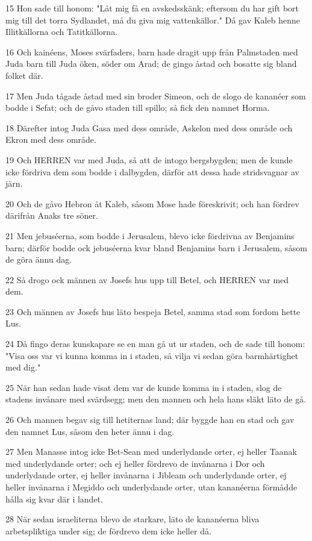 \par 15 Hon sade till honom: "Låt mig få en avskedsskänk; eftersom du har gift bort mig till det torra Sydlandet, må du giva mig vattenkällor." Då gav Kaleb henne Illitkällorna och Tatitkällorna.
\par 16 Och kainéens, Moses svärfaders, barn hade dragit upp från Palmstaden med Juda barn till Juda öken, söder om Arad; de gingo åstad och bosatte sig bland folket där.
\par 17 Men Juda tågade åstad med sin broder Simeon, och de slogo de kananéer som bodde i Sefat; och de gåvo staden till spillo; så fick den namnet Horma.
\par 18 Därefter intog Juda Gasa med dess område, Askelon med dess område och Ekron med dess område.
\par 19 Och HERREN var med Juda, så att de intogo bergsbygden; men de kunde icke fördriva dem som bodde i dalbygden, därför att dessa hade stridsvagnar av järn.
\par 20 Och de gåvo Hebron åt Kaleb, såsom Mose hade föreskrivit; och han fördrev därifrån Anaks tre söner.
\par 21 Men jebuséerna, som bodde i Jerusalem, blevo icke fördrivna av Benjamins barn; därför bodde ock jebuséerna kvar bland Benjamins barn i Jerusalem, såsom de göra ännu dag.
\par 22 Så drogo ock männen av Josefs hus upp till Betel, och HERREN var med dem.
\par 23 Och männen av Josefs hus läto bespeja Betel, samma stad som fordom hette Lus.
\par 24 Då fingo deras kunskapare se en man gå ut ur staden, och de sade till honom: "Visa oss var vi kunna komma in i staden, så vilja vi sedan göra barmhärtighet med dig."
\par 25 När han sedan hade visat dem var de kunde komma in i staden, slog de stadens invånare med svärdsegg; men den mannen och hela hans släkt läto de gå.
\par 26 Och mannen begav sig till hetiternas land; där byggde han en stad och gav den namnet Lus, såsom den heter ännu i dag.
\par 27 Men Manasse intog icke Bet-Sean med underlydande orter, ej heller Taanak med underlydande orter; och ej heller fördrevo de invånarna i Dor och underlydande orter, ej heller invånarna i Jibleam och underlydande orter, ej heller invånarna i Megiddo och underlydande orter, utan kananéerna förmådde hålla sig kvar där i landet.
\par 28 När sedan israeliterna blevo de starkare, läto de kananéerna bliva arbetspliktiga under sig; de fördrevo dem icke heller då.
